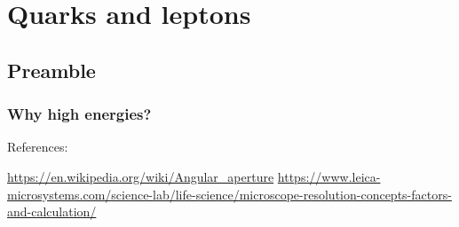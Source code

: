 \documentclass{book}
\begin{document}
\chapter{Quarks and leptons}

\section{Preamble}

\subsection{Why high energies?}

References:

\url{https://en.wikipedia.org/wiki/Angular\_aperture}
\url{https://www.leica-microsystems.com/science-lab/life-science/microscope-resolution-concepts-factors-and-calculation/}
\end{document}

